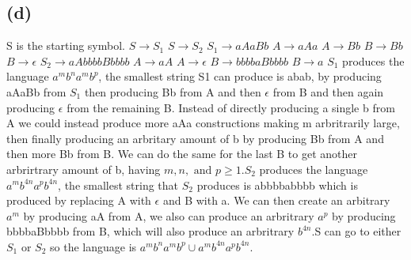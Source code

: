 \documentclass[12pt]{article}
\begin{document}
\subsection*{(d)} S is the starting symbol.
\newline
$S \rightarrow S_1$ \newline
$S \rightarrow S_2$ \newline
$S_1 \rightarrow aAaBb$ \newline
$A \rightarrow aAa$ \newline
$A \rightarrow Bb$ \newline
$B \rightarrow Bb$ \newline
$B \rightarrow \epsilon $ \newline
$S_2 \rightarrow aAbbbbBbbbb$ \newline
$A \rightarrow aA$ \newline
$A \rightarrow \epsilon$ \newline
$B \rightarrow bbbbaBbbbb$ \newline
$B \rightarrow a $ \newline
$S_1$ produces the language $a^mb^na^mb^p$, the smallest string S1 can produce
is abab, by producing aAaBb from $S_1$ then producing Bb from A and then
$\epsilon$ from B and then again producing $\epsilon$ from the remaining B.
Instead of directly producing a single b from A we could instead produce
more aAa constructions making m arbritrarily large, then finally producing an
arbritary amount of b by producing Bb from A and then more Bb from B.
We can do the same for the last B to get another arbrirtrary amount of b,
having $m, n, \text{ and } p \ge 1$.\newline $S_2$ produces the language
$a^mb^{4n}a^pb^{4n}$, the smallest string that $S_2$ produces is abbbbabbbb
which is produced by replacing A with $\epsilon$ and B with a.
We can then create an arbitrary $a^m$ by producing aA from A, we also can
produce an arbritrary $a^p$ by producing bbbbaBbbbb from B, which will also
produce an arbritrary $b^{4n}$.\newline S can go to either $S_1$ or $S_2$ so
the language is $a^mb^na^mb^p \cup a^mb^{4n}a^pb^{4n}$.
\end{document}
